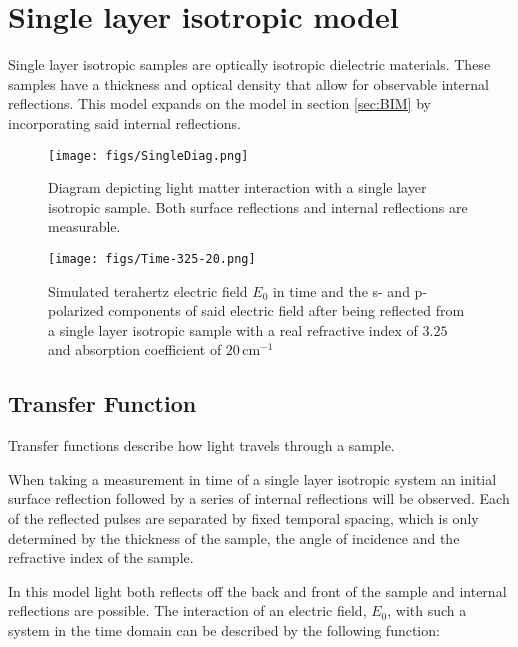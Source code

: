 \section{Single layer isotropic model}
\label{sec:SLM}

Single layer isotropic samples are optically isotropic dielectric materials. These samples have a thickness and optical density that allow for observable internal reflections. This model expands on the model in section \ref{sec:BIM} by incorporating said internal reflections.

\begin{figure}[H]
\begin{center}
	 \texttt{[image: figs/SingleDiag.png]}
	 \caption{Diagram depicting light matter interaction with a single layer isotropic sample. Both surface reflections and internal reflections are measurable.}
   \label{fig:SingleDiag}
\end{center}
\end{figure}

\begin{figure}[H]
\begin{center}
	 \texttt{[image: figs/Time-325-20.png]}
	 \caption{Simulated terahertz electric field $E_{0}$ in time and the s- and p-polarized components of said electric field after being reflected from a single layer isotropic sample with a real refractive index of $3.25$ and absorption coefficient of $20\,\mbox{cm}^{-1}$}
   \label{fig:SingTime}
\end{center}
\end{figure}

\subsection{Transfer Function}
\label{sub: transp}
Transfer functions describe how light travels through a sample. 

When taking a measurement in time of a single layer isotropic system an initial surface reflection followed by a series of internal reflections will be observed. Each of the reflected pulses are separated by fixed temporal spacing, which is only determined by the thickness of the sample, the angle of incidence and the refractive index of the sample.

In this model light both reflects off the back and front of the sample and internal reflections are possible. The interaction of an electric field, $E_{0}$,  with such a system in the time domain can be described by the following function:

